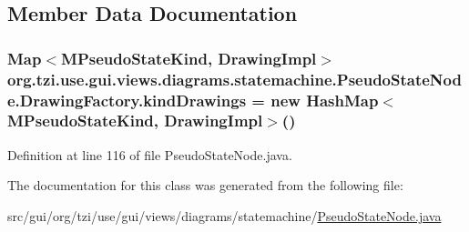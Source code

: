 \subsection{Member Data Documentation}
\hypertarget{classorg_1_1tzi_1_1use_1_1gui_1_1views_1_1diagrams_1_1statemachine_1_1_pseudo_state_node_1_1_drawing_factory_a01a3ac41b6f7d3570c6f2ec0a616f772}{
\subsubsection[{kind\-Drawings}]{\setlength{\rightskip}{0pt plus 5cm}Map$<${\bf M\-Pseudo\-State\-Kind}, {\bf Drawing\-Impl}$>$ org.\-tzi.\-use.\-gui.\-views.\-diagrams.\-statemachine.\-Pseudo\-State\-Node.\-Drawing\-Factory.\-kind\-Drawings = new Hash\-Map$<${\bf M\-Pseudo\-State\-Kind}, {\bf Drawing\-Impl}$>$()\hspace{0.3cm}{\ttfamily [protected]}}}\label{classorg_1_1tzi_1_1use_1_1gui_1_1views_1_1diagrams_1_1statemachine_1_1_pseudo_state_node_1_1_drawing_factory_a01a3ac41b6f7d3570c6f2ec0a616f772}


Definition at line 116 of file Pseudo\-State\-Node.\-java.



The documentation for this class was generated from the following file\-:\begin{DoxyCompactItemize}
\item 
src/gui/org/tzi/use/gui/views/diagrams/statemachine/\hyperlink{_pseudo_state_node_8java}{Pseudo\-State\-Node.\-java}\end{DoxyCompactItemize}
